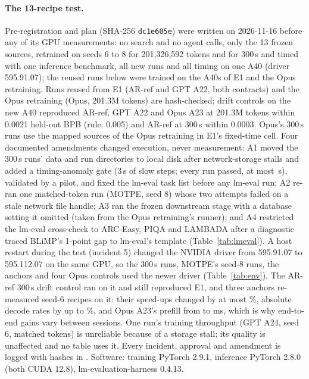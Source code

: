 \documentclass{article}
\begin{document}
\paragraph{The 13-recipe test.} Pre-registration  and plan  (SHA-256 \texttt{dc1e605e}) were written on 2026-11-16 before any of its GPU measurements: no search and no agent calls, only the 13 frozen sources, retrained on seeds 6 to 8 for 201{,}326{,}592 tokens and for 300\,s and timed with one inference benchmark, all new runs and all timing on one A40 (driver 595.91.07); the reused runs below were trained on the A40s of E1 and the Opus retraining. Runs reused from E1 (AR-ref and GPT A22, both contracts) and the Opus retraining (Opus, 201.3M tokens) are hash-checked; drift controls on the new A40 reproduced AR-ref, GPT A22 and Opus A23 at 201.3M tokens within 0.0021 held-out BPB (rule: 0.005) and AR-ref at 300\,s within 0.0003. Opus's 300\,s runs use the mapped sources of the Opus retraining in E1's fixed-time cell. Four documented amendments changed execution, never measurement: A1 moved the 300\,s runs' data and run directories to local disk after network-storage stalls and added a timing-anomaly gate (3\,s of slow steps; every run passed, at most \CRSixFixedMaxExcess\,s), validated by a pilot, and fixed the lm-eval task list before any lm-eval run; A2 re-ran one matched-token run (MOTPE, seed 8) whose two attempts failed on a stale network file handle; A3 ran the frozen downstream stage with a database setting it omitted (taken from the Opus retraining's runner); and A4 restricted the lm-eval cross-check to ARC-Easy, PIQA and LAMBADA after a diagnostic traced BLiMP's 1-point gap to lm-eval's template (Table~\ref{tab:lmeval}). A host restart during the test (incident 5) changed the NVIDIA driver from 595.91.07 to 595.112.07 on the same GPU, so the 300\,s runs, MOTPE's seed-8 runs, the anchors and four Opus controls used the newer driver (Table~\ref{tab:env}). The AR-ref 300\,s drift control ran on it and still reproduced E1, and three anchors re-measured seed-6 recipes on it: their speed-ups changed by at most \CRSixAnchorSpeedMax\%, absolute decode rates by up to \CRSixAnchorDecodeMax\%, and Opus A23's prefill from \CRSixAnchorPreA{} to \CRSixAnchorPreB{} ms, which is why end-to-end gains vary between sessions. One run's training throughput (GPT A24, seed 6, matched tokens) is unreliable because of a storage stall; its quality is unaffected and no table uses it. Every incident, approval and amendment is logged with hashes in . Software: training PyTorch 2.9.1, inference PyTorch 2.8.0 (both CUDA 12.8), lm-evaluation-harness 0.4.13.
\end{document}

